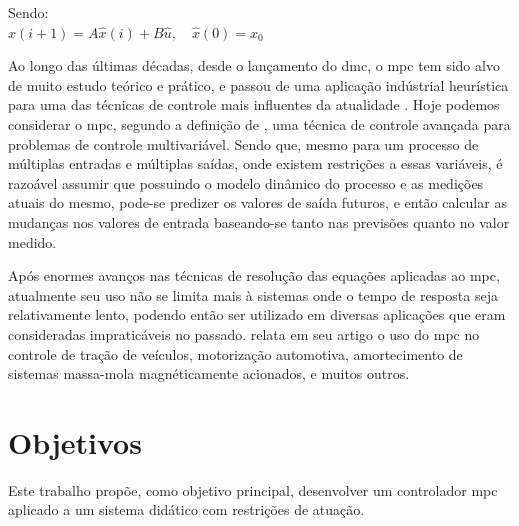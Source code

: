 \noindent
Sendo: 	\\
$ \hat{x}(i+1) = A\hat{x}(i) + B\hat{u}, \quad \hat{x}(0) = x_0 $

Ao longo das últimas décadas, desde o lançamento do \acrshort{dmc}, o \acrshort{mpc}
tem sido alvo de muito estudo teórico e prático, e passou de uma aplicação indústrial
heurística para uma das técnicas de controle mais influentes da atualidade \cite{Lee2011}.
Hoje podemos considerar o \acrshort{mpc}, segundo a definição de ,
uma técnica de controle avançada para problemas de controle multivariável. Sendo que,
mesmo para um processo de múltiplas entradas e múltiplas saídas, onde existem restrições a
essas variáveis, é razoável assumir que possuindo o modelo dinâmico do processo e as medições
atuais do mesmo, pode-se predizer os valores de saída futuros, e então calcular as mudanças nos
valores de entrada baseando-se tanto nas previsões quanto no valor medido.

Após enormes avanços nas técnicas de resolução das equações aplicadas ao \acrshort{mpc},
atualmente seu uso não se limita mais à sistemas onde o tempo de resposta seja relativamente
lento, podendo então ser utilizado em diversas aplicações que eram consideradas impraticáveis
no passado.  relata em seu artigo o uso do \acrshort{mpc} no controle
de tração de veículos, motorização automotiva, amortecimento de sistemas massa-mola magnéticamente
acionados, e muitos outros.


\section{Objetivos}
\label{sec:objetivos}

Este trabalho propõe, como objetivo principal, desenvolver um controlador \acrshort{mpc}
aplicado a um sistema didático com restrições de atuação.

